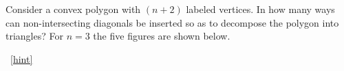 \documentclass{book}
\begin{document}
\setcounter{project}{176}
\addtocounter{project}{-1}
\begin{activity}[]\label{act-traingulations}
\hypertarget{p-1052}{}%
Consider a convex polygon with \((n+2)\) labeled vertices.  In how many ways can non-intersecting diagonals be inserted so as to decompose the polygon into triangles? For \(n = 3\) the five figures are shown below.%
\begin{sidebyside}{5}{0.025}{0.025}{0.05}
\begin{sbspanel}{0.15}
\end{sbspanel}
\begin{sbspanel}{0.15}
\end{sbspanel}
\begin{sbspanel}{0.15}
\end{sbspanel}
\begin{sbspanel}{0.15}
\end{sbspanel}
\begin{sbspanel}{0.15}
\end{sbspanel}
\end{sidebyside}
~\hfill{\tiny\hyperlink{a-176}{[hint]}\hypertarget{q-176}{}}\end{activity}
\end{document}
